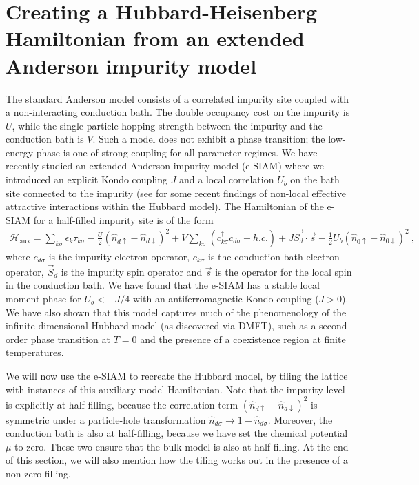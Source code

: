 \documentclass[prb]{revtex4-2}
\begin{document}
\section{Creating a Hubbard-Heisenberg Hamiltonian from an extended Anderson impurity model}

The standard Anderson model consists of a correlated impurity site coupled with a non-interacting conduction bath. The double occupancy cost on the impurity is \(U\), while the single-particle hopping strength between the impurity and the conduction bath is \(V\). Such a model does not exhibit a phase transition; the low-energy phase is one of strong-coupling for all parameter regimes. We have recently studied an extended Anderson impurity model (e-SIAM) where we introduced an explicit Kondo coupling \(J\) and a local correlation \(U_b\) on the bath site connected to the impurity (see \cite{gazizovaleblanc2023} for some recent findings of non-local effective attractive interactions within the Hubbard model). The Hamiltonian of the e-SIAM for a half-filled impurity site is of the form
\begin{equation}\begin{aligned}
	\label{siam_attr}
	\mathcal{H}_\text{aux} = \sum_{k\sigma}\epsilon_k \tau_{k\sigma} - \frac{U}{2}\left(\hat n_{d \uparrow} - \hat n_{d \downarrow} \right) ^2 + V \sum_{k\sigma} \left(c^\dagger_{k\sigma} c_{d\sigma} + h.c.\right) +J \vec{S_d}\cdot\vec{s} - \frac{1}{2}U_b\left(\hat n_{0 \uparrow} - \hat n_{0 \downarrow}\right)^2~,
\end{aligned}\end{equation}
where \(c_{d\sigma}\) is the impurity electron operator, \(c_{k\sigma}\) is the conduction bath electron operator, \(\vec S_d\) is the impurity spin operator and \(\vec s\) is the operator for the local spin in the conduction bath. We have found that the e-SIAM has a stable local moment phase for \(U_b < -J/4\) with an antiferromagnetic Kondo coupling (\(J > 0\)). We have also shown that this model captures much of the phenomenology of the infinite dimensional Hubbard model (as discovered via DMFT), such as a second-order phase transition at \(T=0\) and the presence of a coexistence region at finite temperatures.

We will now use the e-SIAM to recreate the Hubbard model, by tiling the lattice with instances of this auxiliary model Hamiltonian. Note that the impurity level is explicitly at half-filling, because the correlation term \(\left( \hat n_{d \uparrow} - \hat n_{d \downarrow} \right) ^2\) is symmetric under a particle-hole transformation \(\hat n_{d\sigma} \to 1 - \hat n_{d\sigma}\). Moreover, the conduction bath is also at half-filling, because we have set the chemical potential \(\mu\) to zero. These two ensure that the bulk model is also at half-filling. At the end of this section, we will also mention how the tiling works out in the presence of a non-zero filling.
\end{document}
